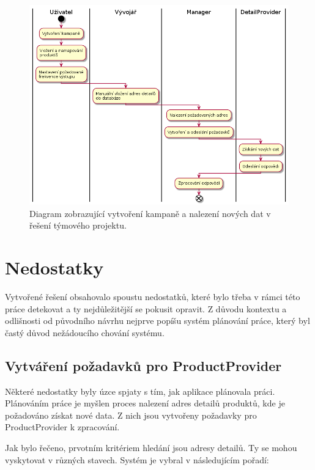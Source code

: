 \documentclass[thesis=B,czech]{FITthesis}[2012/06/26]
\begin{document}
\begin{figure}[h]\centering
 	\includegraphics[width=1.0\textwidth]{resources/legacy-process-activity}
	\caption[Diagram zobrazující vytvoření kampaně a nalezení nových dat v původním řešení týmového projektu]
	{Diagram zobrazující vytvoření kampaně a nalezení nových dat v řešení týmového projektu.}\label{fig:legacyprocess-activity}
\end{figure}

\section{Nedostatky}
Vytvořené řešení obsahovalo spoustu nedostatků, které bylo třeba v rámci této práce detekovat a ty nejdůležitější se pokusit opravit.
Z důvodu kontextu a odlišnosti od původního návrhu nejprve popíšu systém plánování práce, který byl častý důvod nežádoucího chování systému.

\subsection{Vytváření požadavků pro ProductProvider}
Některé nedostatky byly úzce spjaty s tím, jak aplikace plánovala práci. Plánováním práce je myšlen proces
nalezení adres detailů produktů, kde je požadováno získat nové data. Z nich jsou vytvořeny požadavky pro ProductProvider k zpracování.
\par
Jak bylo řečeno, prvotním kritériem hledání jsou adresy detailů. Ty se mohou vyskytovat v různých stavech. Systém je vybral v 
následujícím pořadí:
\end{document}
